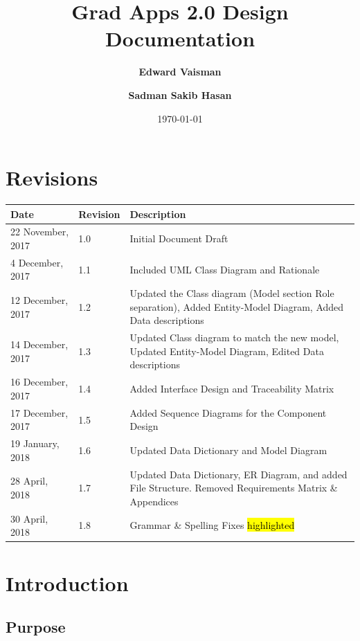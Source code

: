 \documentclass[fontsize=12pt,paper=letter,twoside]{scrartcl}
\author{\textbf{Edward Vaisman}
\and \textbf{Sadman Sakib Hasan}
}
\date{\today} %
\begin{document}
\title{Grad Apps 2.0 Design Documentation}
\maketitle

\newpage

\section*{Revisions}

\begin{tabular}{|l|l|p{3in}|}
\hline
Date & Revision & Description \\ 
\hline
22 November, 2017
& 1.0
& Initial Document Draft \\
\hline
4 December, 2017
& 1.1
& Included UML Class Diagram and Rationale \\
\hline
12 December, 2017
& 1.2
& Updated the Class diagram (Model section Role separation), Added Entity-Model Diagram, Added Data descriptions \\
\hline
14 December, 2017
& 1.3
& Updated Class diagram to match the new model, Updated Entity-Model Diagram, Edited Data descriptions \\
\hline
16 December, 2017
& 1.4
& Added Interface Design and Traceability Matrix \\
\hline
17 December, 2017
& 1.5
& Added Sequence Diagrams for the Component Design \\
\hline
19 January, 2018
& 1.6
& Updated Data Dictionary and Model Diagram \\
\hline
28 April, 2018
& 1.7
& Updated Data Dictionary, ER Diagram, and added File Structure. Removed Requirements Matrix \& Appendices\\
\hline
30 April, 2018
& 1.8
& Grammar \& Spelling Fixes \hl{highlighted}\\
\hline
\end{tabular}

\newpage

\tableofcontents
\listoffigures
\newpage



\clearpage
\section{Introduction}

\subsection{Purpose}
\end{document}

